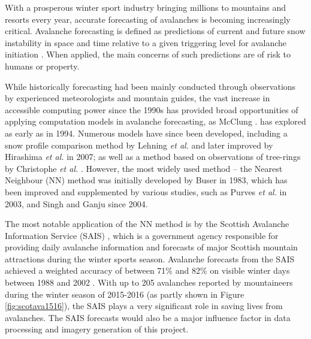 \documentclass[openany]{UoYCSproject}
\begin{document}
With a prosperous winter sport industry bringing millions to mountains and resorts every year\cite{hudson2003sport}, accurate forecasting of avalanches is becoming increasingly critical. Avalanche forecasting is defined as predictions of current and future snow instability in space and time relative to a given triggering level for avalanche initiation \cite[p. 131]{McClung2002}. When applied, the main concerns of such predictions are of risk to humans or property. 

While historically forecasting had been mainly conducted through observations by experienced meteorologists and mountain guides, the vast increase in accessible computing power since the 1990s has provided broad opportunities of applying computation models in avalanche forecasting, as McClung \cite{McClung1994}. has explored as early as in 1994. Numerous models have since been developed, including a snow profile comparison method by Lehning \textit{et al.} \cite{Lehning2001253} and later improved by Hirashima \textit{et al.} in 2007; as well as a method based on observations of tree-rings by Christophe \textit{et al.} \cite{Christophe2010107}. However, the most widely used method -- the Nearest Neighbour (NN) method was initially developed by Buser \cite{buser1983avalanche} in 1983, which has been improved and supplemented by various studies, such as Purves \textit{et al.} in 2003, and Singh and Ganju \cite{Singh2004105} \cite{Singh201533} since 2004.

The most notable application of the NN method is by the Scottish Avalanche Information Service (SAIS) \cite{sais}, which is a government agency responsible for providing daily avalanche information and forecasts of major Scottish mountain attractions during the winter sports season. Avalanche forecasts from the SAIS achieved a weighted accuracy of between 71\% and 82\% on visible winter days between 1988 and 2002 \cite[p. 351] {Purves2003343}. With up to 205 avalanches reported by mountaineers during the winter season of 2015-2016 \cite{sais} (as partly shown in Figure \ref{fig:scotava1516}), the SAIS plays a very significant role in saving lives from avalanches. The SAIS forecasts would also be a major influence factor in data processing and imagery generation of this project.
\end{document}
